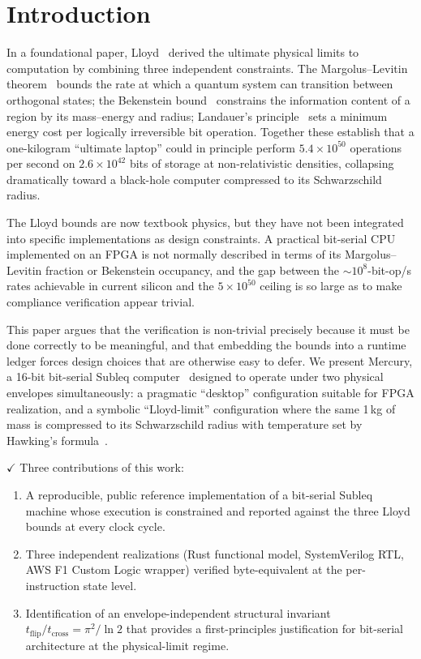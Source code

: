 \documentclass[conference,letterpaper,10pt]{IEEEtran}
\newcommand{\Verified}{\textbf{\textcolor[rgb]{0.0,0.5,0.0}{$\checkmark$}}}
\begin{document}
\section{Introduction}

In a foundational paper, Lloyd~\cite{lloyd2000} derived the ultimate
physical limits to computation by combining three independent
constraints. The Margolus--Levitin theorem~\cite{margolus1998}
bounds the rate at which a quantum system can transition between
orthogonal states; the Bekenstein bound~\cite{bekenstein1981}
constrains the information content of a region by its mass--energy
and radius; Landauer's principle~\cite{landauer1961} sets a minimum
energy cost per logically irreversible bit operation. Together
these establish that a one-kilogram ``ultimate laptop'' could in
principle perform $5.4\times10^{50}$ operations per second on
$2.6\times10^{42}$ bits of storage at non-relativistic densities,
collapsing dramatically toward a black-hole computer compressed to
its Schwarzschild radius.

The Lloyd bounds are now textbook physics, but they have not been
integrated into specific implementations as design constraints. A
practical bit-serial CPU implemented on an FPGA is not normally
described in terms of its Margolus--Levitin fraction or Bekenstein
occupancy, and the gap between the ${\sim}10^{8}$-bit-op/s rates
achievable in current silicon and the $5\times10^{50}$ ceiling is
so large as to make compliance verification appear trivial.

This paper argues that the verification is non-trivial precisely
because it must be done correctly to be meaningful, and that
embedding the bounds into a runtime ledger forces design choices
that are otherwise easy to defer. We present Mercury, a 16-bit
bit-serial Subleq computer~\cite{mavaddat1988,mazonka2011}
designed to operate under two physical envelopes simultaneously:
a pragmatic ``desktop'' configuration suitable for FPGA realization,
and a symbolic ``Lloyd-limit'' configuration where the same
1\,kg of mass is compressed to its Schwarzschild radius with
temperature set by Hawking's
formula~\cite{hawking1975,bekenstein1973}.

\Verified{} Three contributions of this work:
\begin{enumerate}
    \item A reproducible, public reference implementation of a
        bit-serial Subleq machine whose execution is constrained
        and reported against the three Lloyd bounds at every clock
        cycle.
    \item Three independent realizations (Rust functional model,
        SystemVerilog RTL, AWS F1 Custom Logic wrapper) verified
        byte-equivalent at the per-instruction state level.
    \item Identification of an envelope-independent structural
        invariant $t_{\mathrm{flip}}/t_{\mathrm{cross}}=\pi^2/\ln 2$
        that provides a first-principles justification for
        bit-serial architecture at the physical-limit regime.
\end{enumerate}
\end{document}
